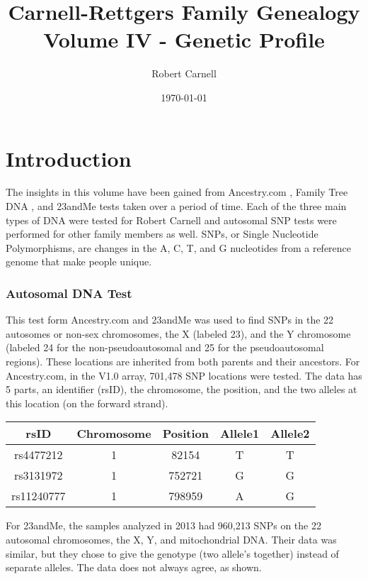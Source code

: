 \documentclass[11pt,letter]{book}
\title{\bf Carnell-Rettgers Family Genealogy \\
       \large Volume IV - Genetic Profile}
\author{Robert Carnell}
\date{\today}
\begin{document}
\frontmatter
\maketitle
\tableofcontents
\mainmatter


\chapter{Introduction}

The insights in this volume have been gained from Ancestry.com , Family Tree DNA , and 23andMe  tests taken over a period of time.  Each of the three main types of DNA were tested for Robert Carnell and autosomal SNP tests were performed for other family members as well.  SNPs, or Single Nucleotide Polymorphisms, are changes in the A, C, T, and G nucleotides from a reference genome that make people unique.

\subsection{Autosomal DNA Test}

This test form Ancestry.com and 23andMe was used to find SNPs in the 22 autosomes or non-sex chromosomes, the X (labeled 23), and the Y chromosome (labeled 24 for the non-pseudoautosomal and 25 for the pseudoautosomal regions).  These locations are inherited from both parents and their ancestors.  For Ancestry.com, in the V1.0 array, 701,478 SNP locations were tested.  The data has 5 parts, an identifier (rsID), the chromosome, the position, and the two alleles at this location (on the forward strand).

\begin{center}
\begin{tabular}{c | c | c | c | c}
	rsID & Chromosome & Position & Allele1 & Allele2 \\
	\hline
	rs4477212 & 1 & 82154 & T & T \\
	rs3131972	& 1 & 752721 & G & G \\
	rs11240777 & 1 & 798959 & A & G \\
\end{tabular}
\end{center}

For 23andMe, the samples analyzed in 2013 had 960,213 SNPs on the 22 autosomal chromosomes, the X, Y, and mitochondrial DNA.  Their data was similar, but they chose to give the genotype (two allele's together) instead of separate alleles.  The data does not always agree, as shown.
\end{document}
